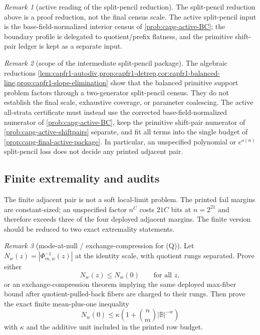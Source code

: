 \documentclass[11pt]{article}
\theoremstyle{definition}
\theoremstyle{remark}
\newtheorem{remark}[remark]{Remark}
\newcommand{\B}{\mathbb{B}}
\begin{document}
\begin{remark}[active reading of the split-pencil reduction]
\label{rem:capfr1-split-pencil-active-reading}
The split-pencil reduction above is a proof reduction, not the final census
scale.  The active split-pencil input is the base-field-normalized interior
census of \cref{prob:capg-active-BC}; the boundary profile is delegated to
quotient/prefix flatness, and the primitive shift-pair ledger is kept as a
separate input.
\end{remark}

\begin{remark}[scope of the intermediate split-pencil package]\label{cor:capfr1-terminal-package}
The algebraic reductions \cref{lem:capfr1-autodiv,prop:capfr1-detrep,cor:capfr1-balanced-line,prop:capfr1-slope-elimination} show that the balanced primitive support problem factors through a two-generator split-pencil census.  They do not establish the final scale, exhaustive coverage, or parameter coalescing.  The active all-strata certificate must instead use the corrected base-field-normalized numerator of \cref{prob:capg-active-BC}, keep the primitive shift-pair numerator of \cref{prob:capg-active-shiftpairs} separate, and fit all terms into the single budget of \cref{prop:capg-final-active-package}.  In particular, an unspecified polynomial or $e^{o(n)}$ split-pencil loss does not decide any printed adjacent pair.
\end{remark}

\subsection{Finite extremality and audits}\label{subsec:capfr1-finite-audits}

The finite adjacent pair is not a soft local-limit problem.  The printed fail margins are constant-sized; an unspecified factor \(n^C\) costs \(21C\) bits at \(n=2^{21}\) and therefore exceeds three of the four deployed adjacent margins.  The finite version should be reduced to two exact extremality statements.

\begin{remark}[mode-at-null / exchange-compression for \textup{(Q)}]\label{prob:capfr1-mode-null}
Let \(N_w(z)=|\Phi_{m,w}^{-1}(z)|\) at the identity scale, with quotient rungs separated.  Prove either
\[
        N_w(z)
        \le
        N_w(0)
        \qquad\text{for all }z,
\]
or an exchange-compression theorem implying the same deployed max-fiber bound after quotient-pulled-back fibers are charged to their rungs.  Then prove the exact finite mean-plus-one inequality
\[
        N_w(0)
        \le
        \kappa\left(1+\binom n m |\B|^{-w}\right)
\]
with \(\kappa\) and the additive unit included in the printed row budget.
\end{remark}
\end{document}
